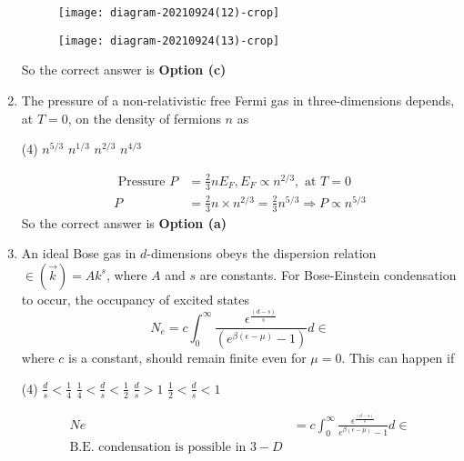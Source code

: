 \begin{enumerate}
\begin{tasks}
		\task[\textbf{c.}] \begin{figure}[H]
			\centering
			\texttt{[image: diagram-20210924(12)-crop]}
		\end{figure}
		\task[\textbf{d.}] \begin{figure}[H]
			\centering
			\texttt{[image: diagram-20210924(13)-crop]}
		\end{figure}
	\end{tasks}
\begin{answer}
	So the correct answer is \textbf{Option (c)}	
\end{answer}
	\item The pressure of a non-relativistic free Fermi gas in three-dimensions depends, at $T=0$, on the density of fermions $n$ as
	{}
	\begin{tasks}(4)
		\task[\textbf{a.}] $n^{5 / 3}$
		\task[\textbf{b.}] $n^{1 / 3}$
		\task[\textbf{c.}]  $n^{2 / 3}$
		\task[\textbf{d.}] $n^{4 / 3}$
	\end{tasks}
\begin{answer}
	\begin{align*}
	\text{	Pressure }P&=\frac{2}{3} n E_{F}, E_{F} \propto n^{2 / 3},\text{ at }T=0\\
	P&=\frac{2}{3} n \times n^{2 / 3}=\frac{2}{3} n^{5 / 3} \Rightarrow P \propto n^{5 / 3}
	\end{align*}
	So the correct answer is \textbf{Option (a)}
\end{answer}
	\item An ideal Bose gas in $d$-dimensions obeys the dispersion relation $\in(\vec{k})=A k^{s}$, where $A$ and $s$ are constants. For Bose-Einstein condensation to occur, the occupancy of excited states
	$$
	N_{e}=c \int_{0}^{\infty} \frac{\epsilon^{\frac{(d-s)}{s}}}{\left(e^{\beta(\epsilon-\mu)}-1\right)} d \in
	$$
	where $c$ is a constant, should remain finite even for $\mu=0$. This can happen if
	{}
	\begin{tasks}(4)
		\task[\textbf{a.}] $\frac{d}{s}<\frac{1}{4}$
		\task[\textbf{b.}] $\frac{1}{4}<\frac{d}{s}<\frac{1}{2}$
		\task[\textbf{c.}] $\frac{d}{s}>1$
		\task[\textbf{d.}] $\frac{1}{2}<\frac{d}{s}<1$
	\end{tasks}
\begin{answer}
	\begin{align*}
	N e&=c \int_{0}^{\infty} \frac{\epsilon^{\frac{(d-s)}{s}}}{e^{\beta(\epsilon-\mu)}-1} d \in\\
	\text{B.E. condensation is possible in $3-D$}\\

\end{align*}
\end{answer}
\end{enumerate}
